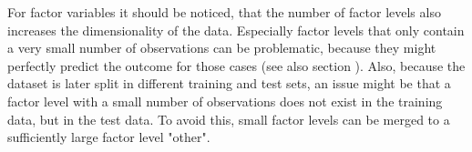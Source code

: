 For factor variables it should be noticed, that the number of factor levels also increases the dimensionality of the data. Especially factor levels that only contain a very small number of observations can be problematic, because they might perfectly predict the outcome for those cases (see also section ). Also, because the dataset is later split in different training and test sets, an issue might be that a factor level with a small number of observations does not exist in the training data, but in the test data. To avoid this, small factor levels can be merged to a sufficiently large factor level "other". 